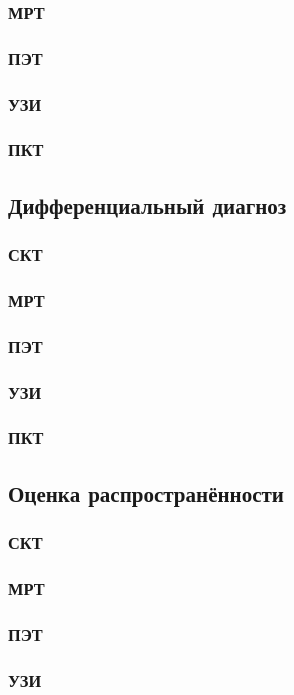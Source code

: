 \subsubsection{МРТ}
\subsubsection{ПЭТ}
\cite{Milojevic2013}
\subsubsection{УЗИ}
\subsubsection{ПКТ}
\subsection{Дифференциальный диагноз}
\subsubsection{СКТ}
\subsubsection{МРТ}
\subsubsection{ПЭТ}
\subsubsection{УЗИ}
\subsubsection{ПКТ}
\subsection{Оценка распространённости}
\subsubsection{СКТ}
\subsubsection{МРТ}
\subsubsection{ПЭТ}
\subsubsection{УЗИ}
